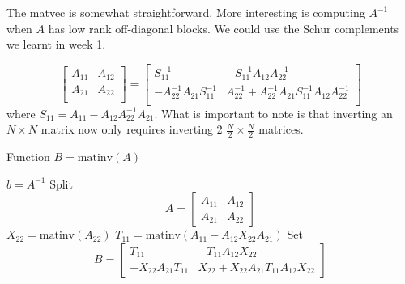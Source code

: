The matvec is somewhat straightforward. More interesting is computing $A^{-1}$ when $A$ has low rank off-diagonal blocks. We could use the Schur complements we learnt in week 1.

\begin{equation*}
    \begin{bmatrix}
        A_{11} & A_{12}\\
        A_{21} & A_{22}\\
    \end{bmatrix}
    =
    \begin{bmatrix}
        S_{11}^{-1} & -S_{11}^{-1}A_{12}A_{22}^{-1}\\
        -A_{22}^{-1}A_{21}S_{11}^{-1} &
        A_{22}^{-1}+A_{22}^{-1}A_{21}S_{11}^{-1}
        A_{12}A_{22}^{-1}\\
    \end{bmatrix}
\end{equation*}
where $S_{11} = A_{11}-A_{12}A_{22}^{-1}A_{21}$. What is important to note is that inverting an $N\times N$ matrix now only requires inverting 2 $\frac{N}{2} \times \frac{N}{2}$ matrices.

\begin{algorithm}
    \caption{Function $B=\text{matinv}(A)$}
    \begin{algorithmic}
            \STATE $b = A^{-1}$
        \ELSE
            \STATE Split \begin{equation*}
                A = \begin{bmatrix}
                    A_{11} & A_{12}\\
                    A_{21} & A_{22}
            \end{bmatrix}
        \end{equation*}
            \STATE $X_{22} = \text{matinv}(A_{22})$
            \STATE $T_{11} = \text{matinv}(A_{11}-A_{12}X_{22}A_{21})$
            \STATE Set \begin{equation*}
            B = \begin{bmatrix}
                T_{11} & -T_{11}A_{12}X_{22}\\
                -X_{22}A_{21}T_{11} &
                X_{22} + X_{22}A_{21}T_{11}A_{12}X_{22}
            \end{bmatrix}
        \end{equation*}
        \ENDIF
    \end{algorithmic}
\end{algorithm}

